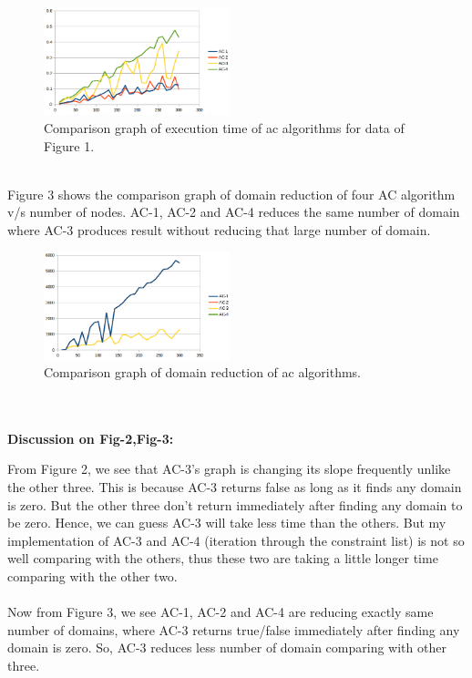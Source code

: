 \documentclass[12pt,twocolumn,letterpaper]{article}
\begin{document}
\begin{figure}[h]
\includegraphics[width=0.48\textwidth]{ac_timeGraph}
\caption{\scriptsize Comparison graph of execution time of ac algorithms for data of Figure 1.}
\end{figure}\\
Figure 3 shows the comparison graph of domain reduction of four AC algorithm v/s number of nodes. AC-1, AC-2 and AC-4 reduces the same number of domain where AC-3 produces result without reducing that large number of domain.\\
\begin{figure}[h]
\includegraphics[width=0.48\textwidth]{ac_domGraph}
\caption{\scriptsize Comparison graph of domain reduction of ac algorithms.}
\end{figure}\\\\
\textbf{\large Discussion on Fig-2,Fig-3: }\\
\par From Figure 2, we see that AC-3's graph is changing its slope frequently unlike the other three. This is because AC-3 returns false as long as it finds any domain is zero. But the other three don't return immediately after finding any domain to be zero. Hence, we can guess AC-3 will take less time than the others. But my implementation of AC-3 and AC-4 (iteration through the constraint list) is not so well comparing with the others, thus these two are taking a little longer time comparing with the other two. \\\\Now from Figure 3, we see AC-1, AC-2 and AC-4 are reducing exactly same number of domains, where AC-3 returns true/false immediately after finding any domain is zero. So, AC-3 reduces less number of domain comparing with other three.
\end{document}
